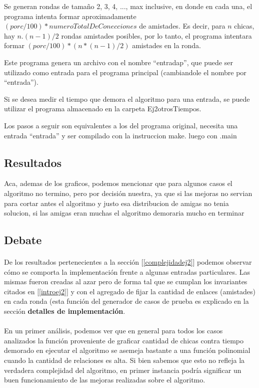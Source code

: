 Se generan rondas de tamaño 2, 3, 4, ..., max inclusive, en donde en cada una, el programa intenta formar aproximadamente $(porc/100)*numeroTotalDeConecciones$ de amistades. Es decir, para $n$ chicas, hay $n$.$(n-1)/2$ rondas amistades posibles, por lo tanto, el programa intentara formar $(porc/100)*(n*(n-1)/2)$ amistades en la ronda.

Este programa genera un archivo con el nombre ``entradap'', que puede ser utilizado como entrada para el programa principal (cambiandole el nombre por ``entrada'').


Si se desea medir el tiempo que demora el algoritmo para una entrada, se puede utilizar el programa almacenado en la carpeta Ej2\/otros\/Tiempos.

Los pasos a seguir son equivalentes a los del programa original, necesita una entrada ``entrada'' y ser compilado con la instruccion make. 
luego con .\/main 

\subsection{Resultados}
\label{resultadosej2}
Aca, ademas de los graficos, podemos mencionar que para algunos casos el algoritmo no termino, pero por decisión nuestra, ya que si las mejoras no servian para cortar antes el algoritmo y justo esa distribucion de amigas no tenia solucion, si las amigas eran muchas el algoritmo demoraria mucho en terminar



\subsection{Debate}
\paragraph{}
De los resultados pertenecientes a la sección [\ref{complejidadej2}] podemos observar cómo se comporta la implementación frente a algunas entradas particulares. Las mismas fueron creadas al azar pero de forma tal que se cumplan los invariantes citados en [\ref{introej2}] y con el agregado de fijar la cantidad de enlaces (amistades) en cada ronda (esta función del generador de casos de prueba es explicado en la sección \textbf{detalles de implementación}.


\paragraph{}
En un primer análisis, podemos ver que en general para todos los casos analizados la función proveniente de graficar cantidad de chicas contra tiempo demorado en ejecutar el algoritmo se asemeja bastante a una función polinomial cuando la cantidad de relaciones es alta. Si bien sabemos que esto no refleja la verdadera complejidad del algoritmo, en primer instancia podría significar un buen funcionamiento de las mejoras realizadas sobre el algoritmo.

